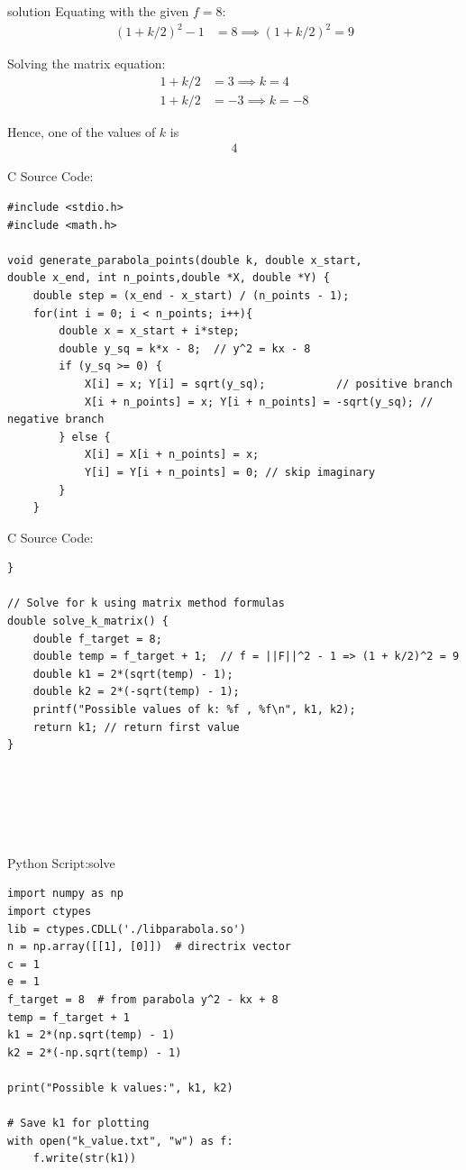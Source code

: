 \documentclass{beamer}
\numberwithin{equation}{section}
\theoremstyle{remark}
\begin{document}
\begin{frame}{solution}
Equating with the given \(f = 8\):
\begin{align}
(1 + k/2)^2 - 1 &= 8 \implies (1 + k/2)^2 = 9
\end{align}

Solving the matrix equation:
\begin{align}
1 + k/2 &= 3 \implies k = 4 \\
1 + k/2 &= -3 \implies k = -8
\end{align}

Hence, one of the values of \(k\) is
\begin{align}
\boxed{4}
\end{align}\end{frame}
\begin{frame}[fragile]{C Source Code:}
\begin{verbatim}
#include <stdio.h>
#include <math.h>

void generate_parabola_points(double k, double x_start,
double x_end, int n_points,double *X, double *Y) {
    double step = (x_end - x_start) / (n_points - 1);
    for(int i = 0; i < n_points; i++){
        double x = x_start + i*step;
        double y_sq = k*x - 8;  // y^2 = kx - 8
        if (y_sq >= 0) {
            X[i] = x; Y[i] = sqrt(y_sq);           // positive branch
            X[i + n_points] = x; Y[i + n_points] = -sqrt(y_sq); // negative branch
        } else {
            X[i] = X[i + n_points] = x;
            Y[i] = Y[i + n_points] = 0; // skip imaginary
        }
    }
\end{verbatim}
\end{frame}
    \begin{frame}[fragile]{C Source Code:}
\begin{verbatim}
}

// Solve for k using matrix method formulas
double solve_k_matrix() {
    double f_target = 8;
    double temp = f_target + 1;  // f = ||F||^2 - 1 => (1 + k/2)^2 = 9
    double k1 = 2*(sqrt(temp) - 1);
    double k2 = 2*(-sqrt(temp) - 1);
    printf("Possible values of k: %f , %f\n", k1, k2);
    return k1; // return first value
}






\end{verbatim}
\end{frame}

\begin{frame}[fragile]{Python Script:solve }
\begin{verbatim}
import numpy as np
import ctypes
lib = ctypes.CDLL('./libparabola.so')
n = np.array([[1], [0]])  # directrix vector
c = 1
e = 1
f_target = 8  # from parabola y^2 - kx + 8
temp = f_target + 1
k1 = 2*(np.sqrt(temp) - 1)
k2 = 2*(-np.sqrt(temp) - 1)

print("Possible k values:", k1, k2)

# Save k1 for plotting
with open("k_value.txt", "w") as f:
    f.write(str(k1))


\end{verbatim}
\end{frame}
\end{document}
